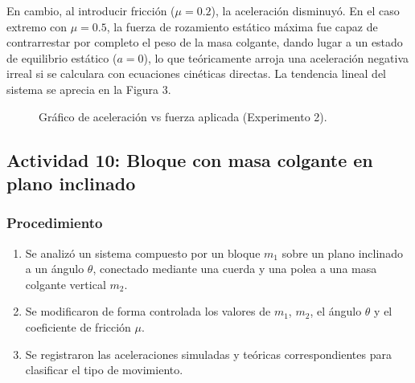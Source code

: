 \documentclass[11pt,a4paper]{article}
\begin{document}
En cambio, al introducir fricción ($\mu = 0.2$), la aceleración disminuyó. En el caso extremo con $\mu = 0.5$, la fuerza de rozamiento estático máxima fue capaz de contrarrestar por completo el peso de la masa colgante, dando lugar a un estado de equilibrio estático ($a = 0$), lo que teóricamente arroja una aceleración negativa irreal si se calculara con ecuaciones cinéticas directas. La tendencia lineal del sistema se aprecia en la Figura 3.

\begin{figure}[H]
    \centering
    \caption{Gráfico de aceleración vs fuerza aplicada (Experimento 2).}
\end{figure}

\subsection{Actividad 10: Bloque con masa colgante en plano inclinado}
\subsubsection{Procedimiento}
\begin{enumerate}
    \item Se analizó un sistema compuesto por un bloque $m_1$ sobre un plano inclinado a un ángulo $\theta$, conectado mediante una cuerda y una polea a una masa colgante vertical $m_2$.
    \item Se modificaron de forma controlada los valores de $m_1$, $m_2$, el ángulo $\theta$ y el coeficiente de fricción $\mu$.
    \item Se registraron las aceleraciones simuladas y teóricas correspondientes para clasificar el tipo de movimiento.
\end{enumerate}
\end{document}
